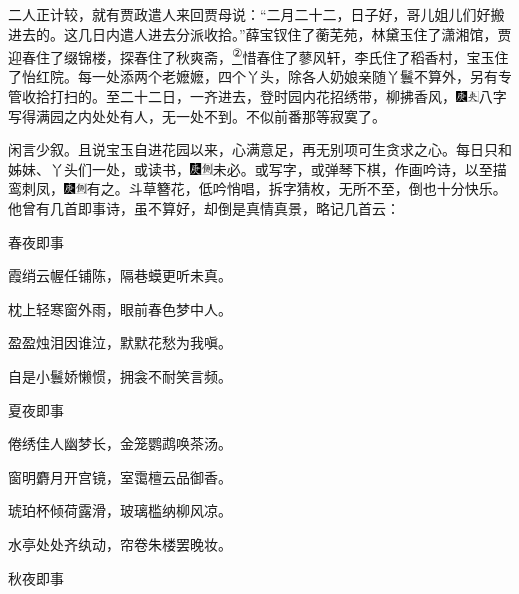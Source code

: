 二人正计较，就有贾政遣人来回贾母说：``二月二十二，日子好，哥儿姐儿们好搬进去的。这几日内遣人进去分派收拾。''薛宝钗住了蘅芜苑，林黛玉住了潇湘馆，贾迎春住了缀锦楼，探春住了秋爽斋，\href{../Text/part0027_split_000.html\#lnkback_2_a}{\textsuperscript{②}}惜春住了蓼风轩，李氏住了稻香村，宝玉住了怡红院。每一处添两个老嬷嬷，四个丫头，除各人奶娘亲随丫鬟不算外，另有专管收拾打扫的。至二十二日，一齐进去，登时园内花招绣带，柳拂香风，{\includegraphics[width=3mm]{../Images/00004}\includegraphics[width=3mm]{../Images/00012}\footnotesize \kaishu 八字写得满园之内处处有人，无一处不到。}不似前番那等寂寞了。

闲言少叙。且说宝玉自进花园以来，心满意足，再无别项可生贪求之心。每日只和姊妹、丫头们一处，或读书，{\includegraphics[width=3mm]{../Images/00004}\includegraphics[width=3mm]{../Images/00011}\footnotesize \kaishu 未必。}或写字，或弹琴下棋，作画吟诗，以至描鸾刺凤，{\includegraphics[width=3mm]{../Images/00004}\includegraphics[width=3mm]{../Images/00011}\footnotesize \kaishu 有之。}斗草簪花，低吟悄唱，拆字猜枚，无所不至，倒也十分快乐。他曾有几首即事诗，虽不算好，却倒是真情真景，略记几首云：

春夜即事

霞绡云幄任铺陈，隔巷蟆更听未真。

枕上轻寒窗外雨，眼前春色梦中人。

盈盈烛泪因谁泣，默默花愁为我嗔。

自是小鬟娇懒惯，拥衾不耐笑言频。

夏夜即事

倦绣佳人幽梦长，金笼鹦鹉唤茶汤。

窗明麝月开宫镜，室霭檀云品御香。

琥珀杯倾荷露滑，玻璃槛纳柳风凉。

水亭处处齐纨动，帘卷朱楼罢晚妆。

秋夜即事

